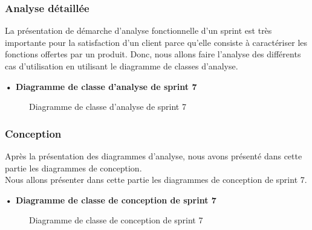 \subsubsection{Analyse détaillée}
La présentation de démarche d'analyse fonctionnelle d'un sprint est très importante pour la satisfaction d'un client parce qu'elle consiste à caractériser les fonctions offertes par un produit.
Donc, nous allons faire l'analyse des différents cas d'utilisation en utilisant le diagramme de classes d'analyse.


\setlength{\parskip}{1em}
\setlength{\parindent}{0em}

\textbf{•	Diagramme de classe d'analyse de sprint 7 }


\begin{figure}[H]
  \centering
  \caption{Diagramme de classe d'analyse de sprint 7}
  \label{fig:class_analyse_sprint7}
\end{figure}


\subsubsection{Conception}

Après la présentation des diagrammes d'analyse, nous avons présenté dans cette partie les diagrammes de conception.\\ 
Nous allons présenter dans cette partie les diagrammes de conception de sprint 7. \\
\begin{landscape}

\textbf{•	Diagramme de classe de conception de sprint 7}

\begin{figure}[H]
  \centering
  \caption{Diagramme de classe de conception de sprint 7}
  \label{fig:class_diagram_5}
\end{figure}
\end{landscape}


